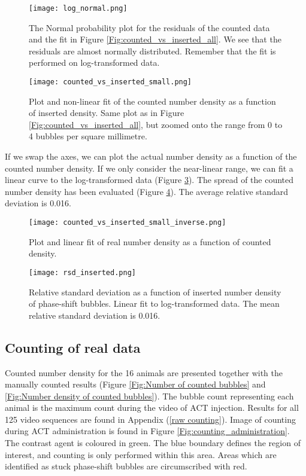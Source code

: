 \begin{figure}[h]
	\centering
	\texttt{[image: log\_normal.png]}
	\caption{The Normal probability plot for the residuals of the counted data and the fit in Figure \ref{Fig:counted_vs_inserted_all}. We see that the residuals are almost normally distributed. Remember that the fit is performed on log-transformed data.}
	\label{Fig:log_normal}
\end{figure}

\begin{figure}[h]
  \centering
  \texttt{[image: counted\_vs\_inserted\_small.png]}
  \caption{Plot and non-linear fit of the counted number density as a function of inserted density. Same plot as in Figure \ref{Fig:counted_vs_inserted_all}, but zoomed onto the range from 0 to 4 bubbles per square millimetre.}
  \label{Fig:counted_vs_inserted_all_small}
\end{figure}

If we swap the axes, we can plot the actual number density as a function of the counted number density. If we only consider the near-linear range, we can fit a linear curve to the log-transformed data (Figure \ref{Fig:counted_vs_inserted_inverse}). The spread of the counted number density has been evaluated (Figure \ref{Fig:rsd}). The average relative standard deviation is 0.016.

\begin{figure}[h]
  \centering
  \texttt{[image: counted\_vs\_inserted\_small\_inverse.png]}
  \caption{Plot and linear fit of real number density as a function of counted density.}
  \label{Fig:counted_vs_inserted_inverse}
\end{figure}

\begin{figure}[h]
	\centering
	\texttt{[image: rsd\_inserted.png]}
	\caption{Relative standard deviation as a function of inserted number density of phase-shift bubbles. Linear fit to log-transformed data. The mean relative standard deviation is 0.016.}
	\label{Fig:rsd}
\end{figure}


\subsection{Counting of real data}
Counted number density for the 16 animals are presented together with the manually counted results (Figure \ref{Fig:Number of counted bubbles} and \ref{Fig:Number density of counted bubbles}). The bubble count representing each animal is the maximum count during the video of ACT\texttrademark{} injection. Results for all 125 video sequences are found in Appendix (\ref{raw counting}). Image of counting during ACT\texttrademark{} administration is found in Figure \ref{Fig:counting_administration}. The contrast agent is coloured in green. The blue boundary defines the region of interest, and counting is only performed within this area. Areas which are identified as stuck phase-shift bubbles are circumscribed with red.

